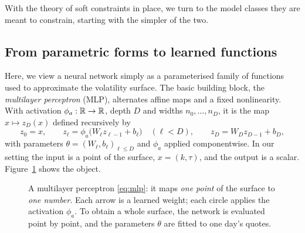 With the theory of soft constraints in place, we turn to the model classes they are meant to
constrain, starting with the simpler of the two.

\subsection{From parametric forms to learned functions}

Here, we view a neural network simply as a parameterised family of functions used to approximate
the volatility surface. The basic building block, the \emph{multilayer perceptron} (MLP),
alternates affine maps and a fixed nonlinearity. With activation $\phi_a:\mathbb{R}\to\mathbb{R}$, depth $D$ and
widths $n_0,\dots,n_D$, it is the map $x\mapsto z_D(x)$ defined recursively by
\begin{equation}\label{eq:mlp}
z_0=x,\qquad
z_\ell=\phi_a\bigl(W_\ell z_{\ell-1}+b_\ell\bigr)\quad(\ell<D),\qquad
z_D=W_Dz_{D-1}+b_D,
\end{equation}
with parameters $\theta=(W_\ell,b_\ell)_{\ell\le D}$ and $\phi_a$ applied componentwise. In our
setting the input is a point of the surface, $x=(k,\tau)$, and the output is a scalar.
Figure~\ref{fig:mlp} shows the object.

\begin{figure}[htbp]\centering
{}
\caption{A multilayer perceptron \eqref{eq:mlp}: it maps \emph{one point} of the surface to
\emph{one number}. Each arrow is a learned weight; each circle applies the activation $\phi_a$.
To obtain a whole surface, the network is evaluated point by point, and the parameters $\theta$
are fitted to one day's quotes.}\label{fig:mlp}
\end{figure}

